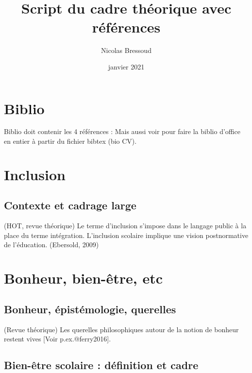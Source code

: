 \documentclass[
  french,
]{article}
\title{Script du cadre théorique avec références}
\author{Nicolas Bressoud}
\date{janvier 2021}
\begin{document}
\maketitle

\renewcommand*\contentsname{Table des matières}
{
\setcounter{tocdepth}{2}
\tableofcontents
}
\hypertarget{biblio}{%
\section{Biblio}\label{biblio}}

Biblio doit contenir les 4 références :
Mais aussi voir pour faire la biblio d'office en entier à partir du fichier bibtex (bio CV).

\hypertarget{inclusion}{%
\section{Inclusion}\label{inclusion}}

\hypertarget{contexte-et-cadrage-large}{%
\subsection{Contexte et cadrage large}\label{contexte-et-cadrage-large}}

(HOT, revue théorique) Le terme d'inclusion s'impose dans le langage public à la place du terme intégration. L'inclusion scolaire implique une vision postnormative de l'éducation. (Ebersold, 2009)

\hypertarget{bonheur-bien-uxeatre-etc}{%
\section{Bonheur, bien-être, etc}\label{bonheur-bien-uxeatre-etc}}

\hypertarget{bonheur-uxe9pistuxe9mologie-querelles}{%
\subsection{Bonheur, épistémologie, querelles}\label{bonheur-uxe9pistuxe9mologie-querelles}}

(Revue théorique) Les querelles philosophiques autour de la notion de bonheur restent vives {[}Voir p.ex.@ferry2016{]}.

\hypertarget{bien-uxeatre-scolaire-duxe9finition-et-cadre}{%
\subsection{Bien-être scolaire : définition et cadre}\label{bien-uxeatre-scolaire-duxe9finition-et-cadre}}
\end{document}
